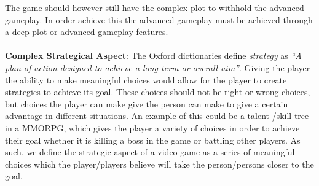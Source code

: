 The game should however still have the complex plot to withhold the advanced gameplay. 
In order achieve this the advanced gameplay must be achieved through a deep plot or advanced gameplay features.\\\\
\textbf{Complex Strategical Aspect}: The Oxford dictionaries define \textit{strategy} as \textit{``A plan of action designed to achieve a long-term or overall aim''}.\cite{strategyOx}
Giving the player the ability to make meaningful choices would allow for the player to create strategies to achieve its goal.
These choices should not be right or wrong choices, but choices the player can make give the person can make to give a certain advantage in different situations.
An example of this could be a talent-/skill-tree in a MMORPG, which gives the player a variety of choices in order to achieve their goal whether it is killing a boss in the game or battling other players.
As such, we define the strategic aspect of a video game as a series of meaningful choices which the player/players believe will take the person/persons closer to the goal.